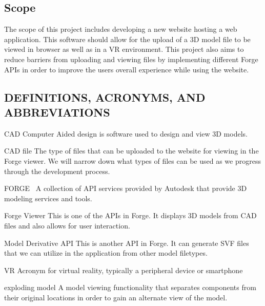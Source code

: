 \documentclass[letterpaper, 10pt, draftclsnofoot, compsoc, onecolumn]{IEEEtran}
\begin{document}
\subsection{Scope}
	The scope of this project includes developing a new website hosting a web application.
 	This software should allow for the upload of a 3D model file to be viewed in browser as well as in a VR environment. 
	This project also aims to reduce barriers from uploading and viewing files by implementing different Forge APIs in order to improve the users 
	overall experience while using the website.

\subsection{DEFINITIONS, ACRONYMS, AND ABBREVIATIONS}
	\begin{description}
	\item{CAD} Computer Aided design is software used to design and view 3D models.

	\item{CAD file} The type of files that can be uploaded to the website for viewing in the Forge viewer. 
	We will  narrow down what types of files can be used as we progress through the development process.

	\item{FORGE}~\cite{forge2016} A collection of API services provided by Autodesk that provide 3D modeling services and tools.

	\item{Forge Viewer} This is one of the APIs in Forge. It displays 3D models from CAD files and also allows
	for user interaction.
	
	\item{Model Derivative API} This is another API in Forge. It can generate SVF files that we can utilize in the application from other model filetypes.
	
	\item{VR} Acronym for virtual reality, typically a peripheral device or smartphone
	\item{exploding model} A model viewing functionality that separates components from their original locations in order to gain an alternate view of the model.
	\end{description} 

\clearpage
	


\end{document}

